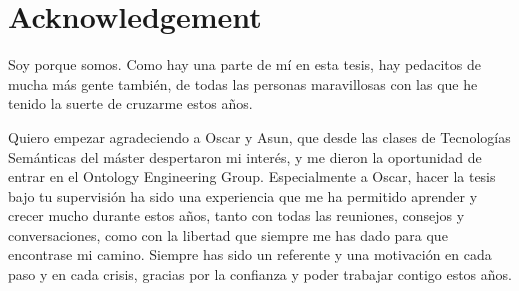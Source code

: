 %
\section*{Acknowledgement}
\label{sec::acknowledgement}


Soy porque somos. Como hay una parte de mí en esta tesis, hay pedacitos de mucha más gente también, de todas las personas maravillosas con las que he tenido la suerte de cruzarme estos años.

Quiero empezar agradeciendo a Oscar y Asun, que desde las clases de Tecnologías Semánticas del máster despertaron mi interés, y me dieron la oportunidad de entrar en el Ontology Engineering Group. 
Especialmente a Oscar, hacer la tesis bajo tu supervisión ha sido una experiencia que me ha permitido aprender y crecer mucho durante estos años, tanto con todas las reuniones, consejos y conversaciones, como con la libertad que siempre me has dado para que encontrase mi camino. Siempre has sido un referente y una motivación en cada paso y en cada crisis, gracias por la confianza y poder trabajar contigo estos años.

